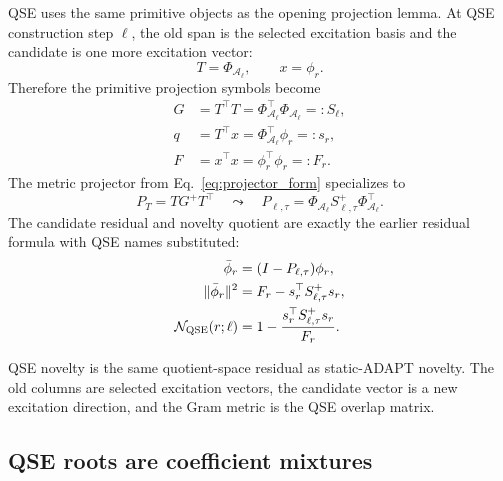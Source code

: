 \documentclass[10pt,twocolumn]{article}
\newcommand{\nov}{\mathcal N}
\begin{document}
QSE uses the same primitive objects as the opening projection lemma. At QSE construction step \(\ell\), the old span is the selected excitation basis and the candidate is one more excitation vector:
\begin{equation}
T=\Phi_{\mathcal A_\ell},
\qquad
x=\phi_r.
\label{eq:qse_Tx_bridge}
\end{equation}
Therefore the primitive projection symbols become
\begin{equation}
\begin{aligned}
G&=T^\top T
=\Phi_{\mathcal A_\ell}^\top\Phi_{\mathcal A_\ell}
=:S_\ell,\\
q&=T^\top x
=\Phi_{\mathcal A_\ell}^\top\phi_r
=:s_r,\\
F&=x^\top x
=\phi_r^\top\phi_r
=:F_r.
\end{aligned}
\label{eq:qse_primitive_bridge}
\end{equation}
The metric projector from Eq.~\eqref{eq:projector_form} specializes to
\begin{equation}
P_T=T G^+T^\top
\quad\leadsto\quad
P_{\ell,\tau}
=\Phi_{\mathcal A_\ell}S_{\ell,\tau}^{+}
\Phi_{\mathcal A_\ell}^{\top}.
\label{eq:qse_projector_bridge}
\end{equation}
The candidate residual and novelty quotient are exactly the earlier residual formula with QSE names substituted:
\begin{equation}
\begin{aligned}
\bar\phi_r
&=(I-P_{\ell,\tau})\phi_r,\\
\|\bar\phi_r\|^2
&=F_r-s_r^\top S_{\ell,\tau}^{+}s_r,\\
\nov_{\rm QSE}(r;\ell)
&=1-\frac{s_r^\top S_{\ell,\tau}^{+}s_r}{F_r}.
\end{aligned}
\label{eq:qse_novelty_bridge}
\end{equation}

\begin{paperbox}
QSE novelty is the same quotient-space residual as static-ADAPT novelty. The old columns are selected excitation vectors, the candidate vector is a new excitation direction, and the Gram metric is the QSE overlap matrix.
\end{paperbox}

\subsection{QSE roots are coefficient mixtures}
\end{document}
